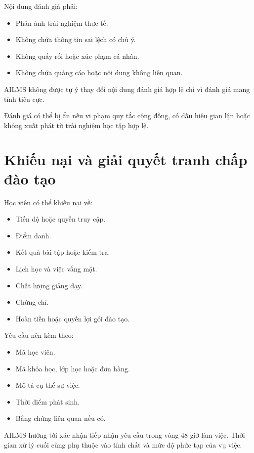 \documentclass[12pt,a4paper]{article}
\begin{document}
Nội dung đánh giá phải:

\begin{itemize}
    \item Phản ánh trải nghiệm thực tế.
    \item Không chứa thông tin sai lệch có chủ ý.
    \item Không quấy rối hoặc xúc phạm cá nhân.
    \item Không chứa quảng cáo hoặc nội dung không liên quan.
\end{itemize}

AILMS không được tự ý thay đổi nội dung đánh giá hợp lệ
chỉ vì đánh giá mang tính tiêu cực.

Đánh giá có thể bị ẩn nếu vi phạm quy tắc cộng đồng,
có dấu hiệu gian lận hoặc không xuất phát từ trải nghiệm học tập hợp lệ.

\section{Khiếu nại và giải quyết tranh chấp đào tạo}

Học viên có thể khiếu nại về:

\begin{itemize}
    \item Tiến độ hoặc quyền truy cập.
    \item Điểm danh.
    \item Kết quả bài tập hoặc kiểm tra.
    \item Lịch học và việc vắng mặt.
    \item Chất lượng giảng dạy.
    \item Chứng chỉ.
    \item Hoàn tiền hoặc quyền lợi gói đào tạo.
\end{itemize}

Yêu cầu nên kèm theo:

\begin{itemize}
    \item Mã học viên.
    \item Mã khóa học, lớp học hoặc đơn hàng.
    \item Mô tả cụ thể sự việc.
    \item Thời điểm phát sinh.
    \item Bằng chứng liên quan nếu có.
\end{itemize}

AILMS hướng tới xác nhận tiếp nhận yêu cầu trong vòng 48 giờ làm việc.
Thời gian xử lý cuối cùng phụ thuộc vào tính chất và mức độ phức tạp của vụ việc.
\end{document}
